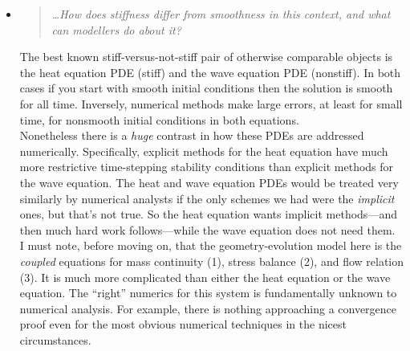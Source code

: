 \documentclass[11pt,reqno]{amsart}
\newcommand{\reply}[2]{
\medskip\medskip
\item  \begin{quote}
\emph{#1}
\end{quote}

\medskip
\noindent #2}
\begin{document}
\begin{itemize}
\reply{\dots How does stiffness differ from smoothness in this context, and what can modellers do about it?}
{The best known stiff-versus-not-stiff pair of otherwise comparable objects is the heat equation PDE (stiff) and the wave equation PDE (nonstiff).  In both cases if you start with smooth initial conditions then the solution is smooth for all time.  Inversely, numerical methods make large errors, at least for small time, for nonsmooth initial conditions in both equations. \medskip \\
Nonetheless there is a \emph{huge} contrast in how these PDEs are addressed numerically.   Specifically, explicit methods for the heat equation have much more restrictive time-stepping stability conditions than explicit methods for the wave equation.  The heat and wave equation PDEs would be treated very similarly by numerical analysts if the only schemes we had were the \emph{implicit} ones, but that's not true.  So the heat equation wants implicit methods---and then much hard work follows---while the wave equation does not need them. \medskip \\
I must note, before moving on, that the geometry-evolution model here is the \emph{coupled} equations for mass continuity (1), stress balance (2), and flow relation (3).  It is much more complicated than either the heat equation or the wave equation.  The ``right'' numerics for this system is fundamentally unknown to numerical analysis.  For example, there is nothing approaching a convergence proof even for the most obvious numerical techniques in the nicest circumstances.}


\end{itemize}
\end{document}

